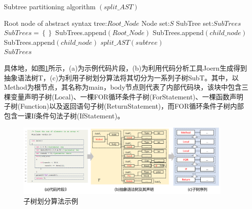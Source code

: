 \begin{algorithm}[ht]  
	\renewcommand{\algorithmicrequire}{\textbf{Input:}}
	\renewcommand{\algorithmicensure}{\textbf{Output:}}
	\caption{Subtree partitioning algorithm $\left(split\_AST\right)$}  
	\label{alg2}
	\begin{algorithmic}[1]
    \Require Root node of abstract syntax tree:$Root\_Node$
    \Require Node set:$S$
		\Ensure SubTree set:$SubTrees$
    \State $SubTrees = \left\{\right\} $    
    \State SubTrees.append$\left(Root\_Node\right)$
        \State SubTrees.append$\left(child\_node\right)$
      \Else
            \State SubTrees.append$\left(child\_node\right)$
          \Else
            \State $ split\_AST\left(subtree\right)$
          \EndIf
        \EndFor
      \EndIf
    \EndFor \\
    \Return $SubTrees$
	\end{algorithmic}
\end{algorithm}

具体地，如图\ref{fig:astshili}所示，(a)为示例代码片段，(b)为利用代码分析工具Joern生成得到抽象语法树T，(c)为利用子树划分算法将其切分为一系列子树SubT。其中，以Method为根节点，其名称为main，body节点则代表了内部代码块，该块中包含三棵变量声明子树(Local)、一棵FOR循环条件子树(ForStatement)、一棵函数声明子树(Function)以及返回语句子树(ReturnStatement)，而FOR循环条件子树内部包含一课If条件句法子树(IfStatement)。

\begin{figure}[H]
  \centering
  \includegraphics[width=0.95\textwidth]{figures/astshili.png}
  \caption{子树划分算法示例}\label{fig:astshili}
\end{figure}

    

